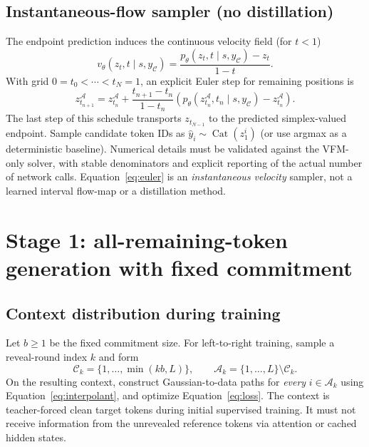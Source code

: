 \documentclass[11pt,a4paper]{article}
\newcommand{\C}{\mathcal C}
\newcommand{\A}{\mathcal A}
\newcommand{\Cat}{\operatorname{Cat}}
\begin{document}
\subsection{Instantaneous-flow sampler (no distillation)}
The endpoint prediction induces the continuous velocity field (for $t<1$)
\begin{equation}
\boxed{v_\theta(z_t,t\mid s,y_{\C})
=\frac{p_\theta(z_t,t\mid s,y_{\C})-z_t}{1-t}.}\label{eq:velocity}
\end{equation}
With grid $0=t_0<\cdots<t_N=1$, an explicit Euler step for remaining positions is
\begin{equation}
z_{t_{n+1}}^{\A}=z_{t_n}^{\A}+
\frac{t_{n+1}-t_n}{1-t_n}
\left(p_\theta(z_{t_n}^{\A},t_n\mid s,y_\C)-z_{t_n}^{\A}\right).
\label{eq:euler}
\end{equation}
The last step of this schedule transports $z_{t_{N-1}}$ to the predicted simplex-valued endpoint. Sample candidate token IDs as $\widehat y_i\sim\Cat(z_1^i)$ (or use argmax as a deterministic baseline). Numerical details must be validated against the VFM-only solver, with stable denominators and explicit reporting of the actual number of network calls. Equation~\eqref{eq:euler} is an \emph{instantaneous velocity} sampler, not a learned interval flow-map or a distillation method.

\section{Stage 1: all-remaining-token generation with fixed commitment}
\subsection{Context distribution during training}
Let $b\ge1$ be the fixed commitment size. For left-to-right training, sample a reveal-round index $k$ and form
\begin{equation}
\C_k=\{1,\ldots,\min(kb,L)\},\qquad
\A_k=\{1,\ldots,L\}\setminus\C_k.
\end{equation}
On the resulting context, construct Gaussian-to-data paths for \emph{every} $i\in\A_k$ using Equation~\eqref{eq:interpolant}, and optimize Equation~\eqref{eq:loss}. The context is teacher-forced clean target tokens during initial supervised training. It must not receive information from the unrevealed reference tokens via attention or cached hidden states.
\end{document}
